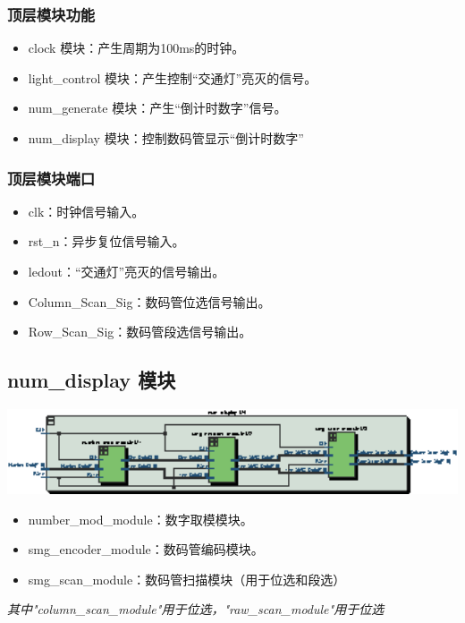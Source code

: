 \documentclass[12pt,a4paper]{article}
\begin{document}
		\subsubsection{顶层模块功能}
			\begin{itemize}
				\item clock 模块：产生周期为100ms的时钟。
				\item light\_control 模块：产生控制“交通灯”亮灭的信号。
				\item num\_generate 模块：产生“倒计时数字”信号。
				\item num\_display 模块：控制数码管显示“倒计时数字”
			\end{itemize}
		\subsubsection{顶层模块端口}
			\begin{itemize}
				\item clk：时钟信号输入。
				\item rst\_n：异步复位信号输入。
				\item ledout：“交通灯”亮灭的信号输出。
				\item Column\_Scan\_Sig：数码管位选信号输出。
				\item Row\_Scan\_Sig：数码管段选信号输出。
			\end{itemize}
		\subsection{num\_display 模块}
		\begin{center}
				\includegraphics[width=16cm]{pic/pdf/numdisplay.eps}
		\end{center}
		\begin{itemize}
			\item number\_mod\_module：数字取模模块。
			\item smg\_encoder\_module：数码管编码模块。
			\item smg\_scan\_module：数码管扫描模块（用于位选和段选）
		\end{itemize}
		
			\emph{其中"column\_scan\_module"用于位选，"raw\_scan\_module"用于位选}
			
\end{document}
